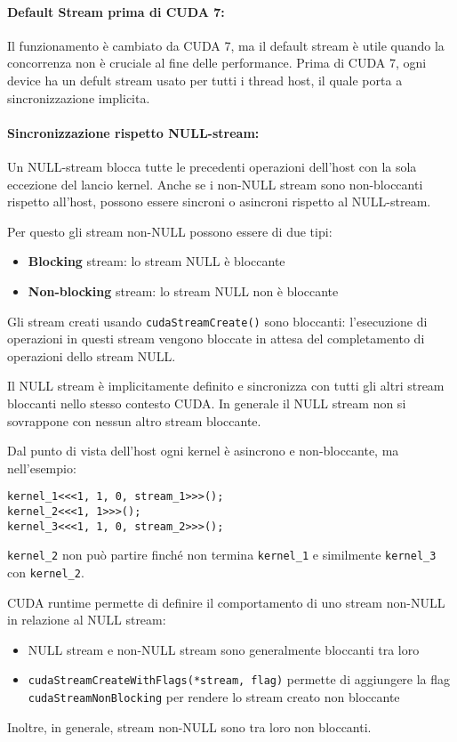 \paragraph{Default Stream prima di CUDA 7:} Il funzionamento è cambiato da CUDA 7, ma il default stream è utile quando la concorrenza non è cruciale al fine delle performance. Prima di CUDA 7, ogni device ha un defult stream usato per tutti i thread host, il quale porta a sincronizzazione implicita.

\paragraph{Sincronizzazione rispetto NULL-stream:} Un NULL-stream blocca tutte le precedenti operazioni dell'host con la sola eccezione del lancio kernel. Anche se i non-NULL stream sono non-bloccanti rispetto all'host, possono essere sincroni o asincroni rispetto al NULL-stream. 

Per questo gli stream non-NULL possono essere di due tipi: 
\begin{itemize}
	\item \textbf{Blocking} stream: lo stream NULL è bloccante
	
	\item \textbf{Non-blocking} stream: lo stream NULL non è bloccante
\end{itemize}

Gli stream creati usando \texttt{cudaStreamCreate()} sono bloccanti: l'esecuzione di operazioni in questi stream vengono bloccate in attesa del completamento di operazioni dello stream NULL.  

Il NULL stream è implicitamente definito e sincronizza con tutti gli altri stream bloccanti nello stesso contesto CUDA. In generale il NULL stream non si sovrappone con nessun altro stream bloccante.

Dal punto di vista dell'host ogni kernel è asincrono e non-bloccante, ma nell'esempio: 
\begin{verbatim}
kernel_1<<<1, 1, 0, stream_1>>>();
kernel_2<<<1, 1>>>();
kernel_3<<<1, 1, 0, stream_2>>>();
\end{verbatim}
\texttt{kernel\_2} non può partire finché non termina \texttt{kernel\_1} e similmente \texttt{kernel\_3} con \texttt{kernel\_2}.

CUDA runtime permette di definire il comportamento di uno stream non-NULL in relazione al NULL stream:
\begin{itemize}
	\item NULL stream e non-NULL stream sono generalmente bloccanti tra loro
	
	\item \texttt{cudaStreamCreateWithFlags(*stream, flag)} permette di aggiungere la flag \texttt{cudaStreamNonBlocking} per rendere lo stream creato non bloccante
\end{itemize}
Inoltre, in generale, stream non-NULL sono tra loro non bloccanti.

